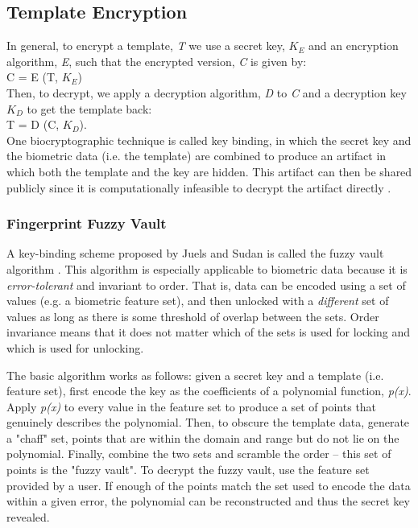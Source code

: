 \documentclass[11pt]{article}
\begin{document}
\subsection{Template Encryption}
In general, to encrypt a template, \textit{T} we use a secret key, \textit{$K_E$}
and an encryption algorithm, \textit{E}, such that the encrypted version, 
\textit{C} is given by: \\
\indent C = E (T, $K_E$)
\\ Then, to decrypt, we apply a decryption algorithm, \textit{D} to \textit{C} 
and a decryption key \textit{$K_D$} to get the template back: \\
\indent T = D (C, $K_D$).
\\One biocryptographic technique is called key binding, in which the secret key
and the biometric data (i.e. the template) are combined to produce an artifact
in which both the template and the key are hidden. This artifact can then be
shared publicly since it is computationally infeasible to decrypt the artifact
directly \cite{Biocryptography10}.

\subsubsection{Fingerprint Fuzzy Vault}
A key-binding scheme proposed by Juels and Sudan is called the fuzzy vault 
algorithm \cite{Juels:2006:FVS:1110940.1110956}. This algorithm is especially
applicable to biometric data because it is \textit{error-tolerant} and 
invariant to order. That is, data can be encoded using a set of values (e.g. a
biometric feature set), and then unlocked with a \textit{different} set of 
values as long as there is some threshold of overlap between the sets. Order
invariance means that it does not matter which of the sets is used for 
locking and which is used for unlocking.

The basic algorithm works as follows: given a secret key and a template (i.e.
feature set), first encode the key as the coefficients of a polynomial function,
\textit{p(x)}. Apply \textit{p(x)} to every value in the feature set to 
produce a set of points that genuinely describes the polynomial. Then, to obscure
the template data, generate a "chaff" set, points that are within the domain
and range but do not lie on the polynomial. Finally, combine the two sets and 
scramble the order -- this set of points is the "fuzzy vault".
To decrypt the fuzzy vault, use the feature set provided by a user. If enough
of the points match the set used to encode the data within a given error, the
polynomial can be reconstructed and thus the secret key revealed. 
\end{document}
